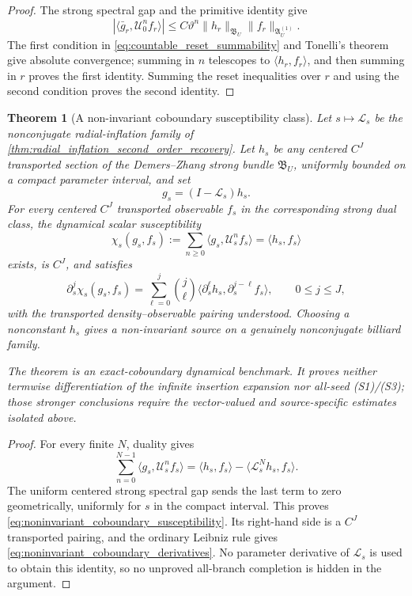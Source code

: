 \documentclass[11pt]{amsart}
\theoremstyle{compactplain}
\newtheorem{theorem}{Theorem}[section]
\theoremstyle{compactdefinition}
\theoremstyle{compactremark}
\newcommand{\Ltransfer}{\mathscr L}
\begin{document}
\begin{proof}
The strong spectral gap and the primitive identity give
\[
 |\langle\bar g_r,\mathscr U_0^nf_r\rangle|
 \le C\vartheta^n\|h_r\|_{\mathfrak B_U}
                         \|f_r\|_{\mathfrak A_U^{(1)}}.
\]
The first condition in \eqref{eq:countable_reset_summability} and Tonelli's
theorem give absolute convergence; summing in \(n\) telescopes to
\(\langle h_r,f_r\rangle\), and then summing in \(r\) proves the first
identity.  Summing the reset inequalities over \(r\) and using the second
condition proves the second identity.
\end{proof}

\begin{theorem}[A non-invariant coboundary susceptibility class]
\label{thm:noninvariant_coboundary_susceptibility}
Let \(s\mapsto\Ltransfer_s\) be the nonconjugate radial-inflation family of
\cref{thm:radial_inflation_second_order_recovery}.  Let \(h_s\) be any
centered \(C^J\) transported section of the Demers--Zhang strong bundle
\(\mathfrak B_U\), uniformly
bounded on a compact parameter interval, and set
\[
 g_s=(I-\Ltransfer_s)h_s.
\]
For every centered \(C^J\) transported observable \(f_s\) in the corresponding
strong dual class, the dynamical scalar susceptibility
\begin{equation}
\label{eq:noninvariant_coboundary_susceptibility}
 \chi_s(g_s,f_s)
 :=
 \sum_{n\ge0}\langle g_s,\mathscr U_s^nf_s\rangle
 =
 \langle h_s,f_s\rangle
\end{equation}
exists, is \(C^J\), and satisfies
\begin{equation}
\label{eq:noninvariant_coboundary_derivatives}
 \partial_s^j\chi_s(g_s,f_s)
 =
 \sum_{\ell=0}^{j}\binom j\ell
 \langle\partial_s^\ell h_s,
        \partial_s^{j-\ell}f_s\rangle ,
 \qquad 0\le j\le J,
\end{equation}
with the transported density--observable pairing understood.
Choosing a nonconstant \(h_s\) gives a non-invariant source on a genuinely
nonconjugate billiard family.

The theorem is an exact-coboundary dynamical benchmark.  It proves neither
termwise differentiation of the infinite insertion expansion nor all-seed
(S1)/(S3); those stronger conclusions require the vector-valued and
source-specific estimates isolated above.
\end{theorem}

\begin{proof}
For every finite \(N\), duality gives
\[
 \sum_{n=0}^{N-1}\langle g_s,\mathscr U_s^nf_s\rangle
 =
 \langle h_s,f_s\rangle
 -\langle\Ltransfer_s^Nh_s,f_s\rangle .
\]
The uniform centered strong spectral gap sends the last term to zero
geometrically, uniformly for \(s\) in the compact interval.  This proves
\eqref{eq:noninvariant_coboundary_susceptibility}.  Its right-hand side is a
\(C^J\) transported pairing, and the ordinary Leibniz rule gives
\eqref{eq:noninvariant_coboundary_derivatives}.  No parameter derivative of
\(\Ltransfer_s\) is used to obtain this identity, so no unproved all-branch
completion is hidden in the argument.
\end{proof}
\end{document}
